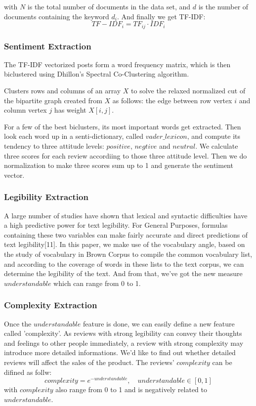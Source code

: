 \documentclass{mcmthesis}
\begin{document}
with $N$ is the total number of documents in the data set, and $d$ is the number of documents containing the keyword $d_i$.
And finally we get TF-IDF:
\begin{equation}
    TF-IDF_i=TF_{ij} \cdot IDF_i
\end{equation}
\subsubsection{Sentiment Extraction}
\quad \quad The TF-IDF vectorized posts form a word frequency matrix, which is then biclustered using Dhillon’s Spectral Co-Clustering algorithm. 

Clusters rows and columns of an array $X$ to solve the relaxed normalized cut of the bipartite graph created from $X$ as follows: the edge between row vertex $i$ and column vertex $j$ has weight $X[i, j]$.

For a few of the best biclusters, its most important words get extracted. Then look each word  up in a senti-dictionary, called $vader\_lexicon$, and compute its tendency to three attitude levels: $positive$, $negtive$ and $neutral$. We calculate three scores for each review accordiing to those three attitude level. Then we do normalization to make three scores sum up to 1 and generate the sentiment vector.
\subsubsection{Legibility Extraction}
\quad \quad A large number of studies have shown that lexical and syntactic difficulties have a high predictive power for text legibility. For General Purposes, formulas containing these two variables can make fairly accurate and direct predictions of text legibility[11]. 
In this paper, we make use of the vocabulary angle, based on the study of vocabulary in Brown Corpus to compile the common vocabulary list, and according to the coverage of words in these lists to the text corpus, we can determine the legibility of the text. And from that, we've got the new measure $understandable$ which can range from 0 to 1.
\subsubsection{Complexity Extraction}
\quad \quad Once the $understandable$ feature is done, we can easily define a new feature called 'complexity'. As reviews with strong legibility can convey their thoughts and feelings to other people immediately, a review with strong complexity may introduce more detailed informations. We'd like to find out whether detailed reviews will affect the sales of the product. The reviews' $complexity$ can be difined as follw:
\begin{equation}
    complexity = e^{-understandable}, \quad understandable \in [0,1]
\end{equation}
with $complexity$ also range from 0 to 1 and is negatively related to $understandable$.
\end{document}
